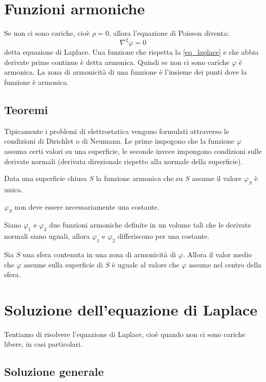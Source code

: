\section{Funzioni armoniche}
Se non ci sono cariche, cioè $\rho=0$, allora l'equazione di Poisson diventa:
\begin{equation}
  \nabla^2\varphi=0
  \label{eq_laplace}
\end{equation}
detta equazione di Laplace. Una funzione che rispetta la \eqref{eq_laplace} e che abbia derivate prime continue è detta armonica. Quindi se non ci sono cariche $\varphi$ è armonica. La zona di armonicità di una funzione è l'insieme dei punti dove la funzione è armonica.
\subsection{Teoremi}
Tipicamente i problemi di elettrostatica vengono formulati attraverso le condizioni di Dirichlet o di Neumann. Le prime impogono che la funzione $\varphi$ assuma certi valori su una superficie, le seconde invece impongono condizioni sulle derivate normali (derivata direzionale rispetto alla normale della superficie).
\begin{Teo}
  Data una superficie chiusa $S$ la funzione armonica che su $S$ assume il valore $\varphi_S$ è unica.
\end{Teo}
$\varphi_S$ non deve essere necessariamente una costante.
\begin{Teo}
  Siano $\varphi_1$ e $\varphi_2$ due funzioni armoniche definite in un volume tali che le derivate normali siano uguali, allora $\varphi_1$ e $\varphi_2$ differiscono per una costante.
\end{Teo}
\begin{Teo}[media]
  Sia $S$ una sfera contenuta in una zona di armonicità di $\varphi$. Allora il valor medio che $\varphi$ assume sulla superficie di $S$ è uguale al valore che $\varphi$ assume nel centro della sfera.
\end{Teo}
\section{Soluzione dell'equazione di Laplace}
Tentiamo di risolvere l'equazione di Laplace, cioè quando non ci sono cariche libere, in casi particolari.
\subsection{Soluzione generale}
